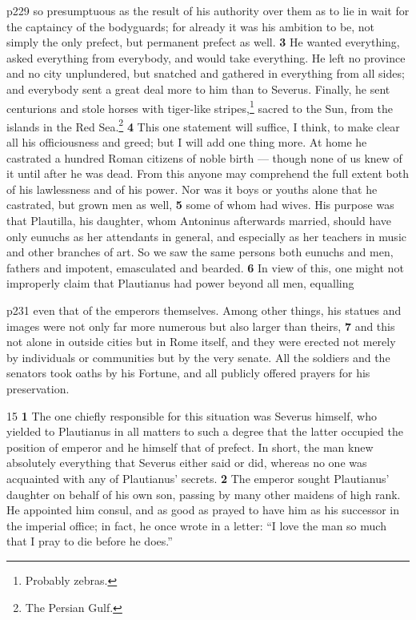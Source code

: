 p229 so presumptuous as the result of his authority over them as to lie in wait for the captaincy of the bodyguards; for already it was his ambition to be, not simply the only prefect, but permanent prefect as well. \textbf{3} He wanted everything, asked everything from everybody, and would take everything. He left no province and no city unplundered, but snatched and gathered in everything from all sides; and everybody sent a great deal more to him than to Severus. Finally, he sent centurions and stole horses with tiger-like stripes,\texthebrew{⁠}\footnote{Probably zebras.

} sacred to the Sun, from the islands in the Red Sea.\texthebrew{⁠}\footnote{The Persian Gulf.

} \textbf{4} This one statement will suffice, I think, to make clear all his officiousness and greed; but I will add one thing more. At home he castrated a hundred Roman citizens of noble birth \texthebrew{—} though none of us knew of it until after he was dead. From this anyone may comprehend the full extent both of his lawlessness and of his power. Nor was it boys or youths alone that he castrated, but grown men as well, \textbf{5} some of whom had wives. His purpose was that Plautilla, his daughter, whom Antoninus afterwards married, should have only eunuchs as her attendants in general, and especially as her teachers in music and other branches of art. So we saw the same persons both eunuchs and men, fathers and impotent, emasculated and bearded. \textbf{6} In view of this, one might not improperly claim that Plautianus had power beyond all men, equalling

p231 even that of the emperors themselves. Among other things, his statues and images were not only far more numerous but also larger than theirs, \textbf{7} and this not alone in outside cities but in Rome itself, and they were erected not merely by individuals or communities but by the very senate. All the soldiers and the senators took oaths by his Fortune, and all publicly offered prayers for his preservation.

15
\textbf{1} The one chiefly responsible for this situation was Severus himself, who yielded to Plautianus in all matters to such a degree that the latter occupied the position of emperor and he himself that of prefect. In short, the man knew absolutely everything that Severus either said or did, whereas no one was acquainted with any of Plautianus' secrets. \textbf{2} The emperor sought Plautianus' daughter on behalf of his own son, passing by many other maidens of high rank. He appointed him consul, and as good as prayed to have him as his successor in the imperial office; in fact, he once wrote in a letter: ``I love the man so much that I pray to die before he does.''

